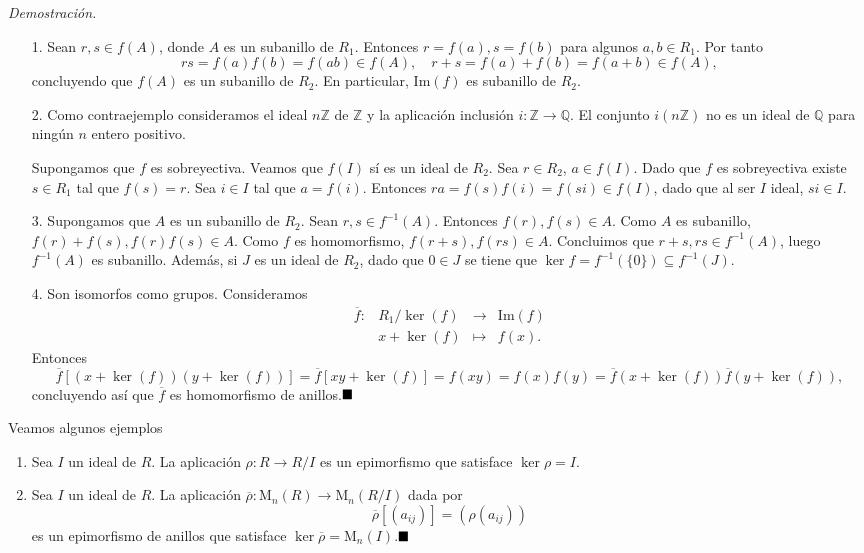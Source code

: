 \documentclass[11pt]{book}
\def\Z{\mathbb{Z}}
\def\Q{\mathbb{Q}}
\def\Im{\mathrm{Im}}
\def\qed{\hfill\blacksquare}
\theoremstyle{definition}
\begin{document}
\noindent\textit{Demostración.} \begin{itemize}
    \item[1.] Sean $r,s\in f(A)$, donde $A$ es un subanillo de $R_1$. Entonces $r=f(a),s=f(b)$ para algunos $a,b\in R_1$. Por tanto\[
    rs=f(a)f(b)=f(ab)\in f(A),\quad r+s=f(a)+f(b)=f(a+b)\in f(A),
    \]concluyendo que $f(A)$ es un subanillo de $R_2$. En particular, $\Im(f)$ es subanillo de $R_2$.
    \item[2.] Como contraejemplo consideramos el ideal $n\Z$ de $\Z$ y la aplicación inclusión $i:\Z\longrightarrow\Q$. El conjunto $i(n\Z)$ no es un ideal de $\Q$ para ningún $n$ entero positivo. 
    
    Supongamos que $f$ es sobreyectiva. Veamos que $f(I)$ sí es un ideal de $R_2$. Sea $r\in R_2$, $a\in f(I)$. Dado que $f$ es sobreyectiva existe $s\in R_1$ tal que $f(s)=r$. Sea $i\in I$ tal que $a=f(i)$. Entonces $ra=f(s)f(i)=f(si)\in f(I)$, dado que al ser $I$ ideal, $si\in I$.
    \item[3.] Supongamos que $A$ es un subanillo de $R_2$. Sean $r,s\in f^{-1}(A)$. Entonces $f(r),f(s)\in A$. Como $A$ es subanillo, $f(r)+f(s),f(r)f(s)\in A$. Como $f$ es homomorfismo, $f(r+s),f(rs)\in A$. Concluimos que $r+s,rs\in f^{-1}(A)$, luego $f^{-1}(A)$ es subanillo. Además, si $J$ es un ideal de $R_2$, dado que $0\in J$ se tiene que $\ker f=f^{-1}(\{0\})\subseteq f^{-1}(J)$.
    
    \item[4.] Son isomorfos como grupos. Consideramos \[\begin{array}{rlcl}
        \overline f:&R_1/\ker(f)&\longrightarrow &\Im(f)\\
        &x+\ker(f)&\longmapsto &f(x).
    \end{array}\]
    Entonces\[
    \overline f[(x + \ker(f))(y + \ker(f))]=\overline f[xy+\ker(f)]=f(xy)=f(x)f(y)=\overline f(x+\ker(f))\overline f(y+\ker(f)),
    \]concluyendo así que $\overline f$ es homomorfismo de anillos.$\qed$
\end{itemize}Veamos algunos ejemplos\begin{enumerate}
    \item Sea $I$ un ideal de $R$. La aplicación $\rho:R\longrightarrow R/I$ es un epimorfismo que satisface $\ker\rho=I$.
    \item Sea $I$ un ideal de $R$. La aplicación $\overline\rho:\mathrm M_n(R)\longrightarrow \mathrm M_n(R/I)$ dada por\[
    \overline\rho[(a_{ij})]=(\rho(a_{ij}))
    \]es un epimorfismo de anillos que satisface $\ker\overline\rho=\mathrm M_n(I)$.$\qed$
\end{enumerate}
\end{document}
